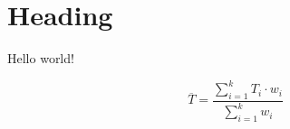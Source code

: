 \documentclass{article}
\begin{document}
\section{Heading} 

Hello world!

\begin{equation}
\overline{T} = \frac{\sum\limits^{k}_{i = 1} %
  T_{i}\cdot w_{i}}{\sum\limits^{k}_{i = 1}w_{i}}
\end{equation}
\end{document}
